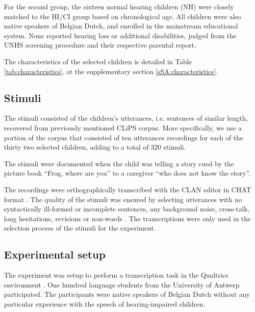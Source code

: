 For the second group, the sixteen normal hearing children (NH) were closely matched to the HI/CI group based on chronological age. All children were also native speakers of Belgian Dutch, and enrolled in the mainstream educational system. None reported hearing loss or additional disabilities, judged from the UNHS screening procedure and their respective parental report.

The characteristics of the selected children is detailed in Table \ref{tab:characteristics}, at the supplementary section \ref{sSA:characteristics}. 
%
%
\subsection{Stimuli} \label{sS:stimuli}
%
The stimuli consisted of the children's utterances, i.e. sentences of similar length, recovered from previously mentioned CLiPS corpus. More specifically, we use a portion of the corpus that consisted of ten utterances recordings for each of the thirty two selected children, adding to a total of $320$ stimuli. 

The stimuli were documented when the child was telling a story cued by the picture book ``Frog, where are you'' \citep{Mayer_1969} to a caregiver ``who does not know the story''. 

The recordings were orthographically transcribed with the CLAN editor in CHAT format \cite{MacWhinney_2020}. The quality of the stimuli was ensured by selecting utterances with no syntactically ill-formed or incomplete sentences, any background noise, cross-talk, long hesitations, revisions or non-words \citep{Boonen_et_al_2021}. The transcriptions were only used in the selection process of the stimuli for the experiment. 
%
\begin{comment}
	under the Design of Experiments (DoE) literature, we would say we have $32$ experimental units with $10$ replicate runs each, making a total of $320$ experimental runs. As it is defined in \citet{Lawson_2015}, an experimental unit is the item under study upon which something is changed, while a replicate run is the experiment conducted with the same factor settings, but using different experimental units. 
\end{comment}
%
%
\subsection{Experimental setup} \label{sS:setup}
%
The experiment was setup to perform a transcription task in the Qualtrics environment \cite{Qualtrics_2005}. One hundred language students from the University of Antwerp participated. The participants were native speakers of Belgian Dutch without any particular experience with the speech of hearing-impaired children.

